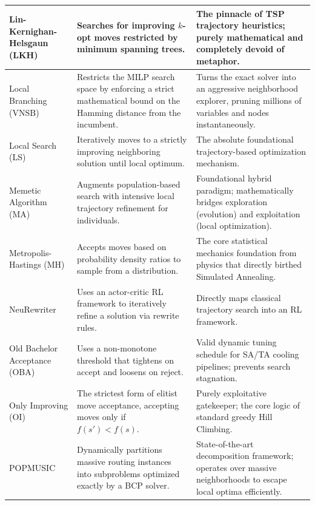 \begin{center}
\begin{longtable}{
  >{\raggedright\arraybackslash}p{}
  >{\raggedright\arraybackslash}p{}
  >{\raggedright\arraybackslash}p{}
}
Lin-Kernighan-Helsgaun (LKH) & Searches for improving $k$-opt moves restricted by minimum spanning trees. & The pinnacle of TSP trajectory heuristics; purely mathematical and completely devoid of metaphor. \\ \midrule

Local Branching (VNSB) & Restricts the MILP search space by enforcing a strict mathematical bound on the Hamming distance from the incumbent. & Turns the exact solver into an aggressive neighborhood explorer, pruning millions of variables and nodes instantaneously. \\ \midrule

Local Search (LS) & Iteratively moves to a strictly improving neighboring solution until local optimum. & The absolute foundational trajectory-based optimization mechanism. \\ \midrule

Memetic Algorithm (MA) & Augments population-based search with intensive local trajectory refinement for individuals. & Foundational hybrid paradigm; mathematically bridges exploration (evolution) and exploitation (local optimization). \\ \midrule

Metropolis-Hastings (MH) & Accepts moves based on probability density ratios to sample from a distribution. & The core statistical mechanics foundation from physics that directly birthed Simulated Annealing. \\ \midrule

NeuRewriter & Uses an actor-critic RL framework to iteratively refine a solution via rewrite rules. & Directly maps classical trajectory search into an RL framework. \\ \midrule

Old Bachelor Acceptance (OBA) & Uses a non-monotone threshold that tightens on accept and loosens on reject. & Valid dynamic tuning schedule for SA/TA cooling pipelines; prevents search stagnation. \\ \midrule

Only Improving (OI) & The strictest form of elitist move acceptance, accepting moves only if $f(s') < f(s)$. & Purely exploitative gatekeeper; the core logic of standard greedy Hill Climbing. \\ \midrule

POPMUSIC & Dynamically partitions massive routing instances into subproblems optimized exactly by a BCP solver. & State-of-the-art decomposition framework; operates over massive neighborhoods to escape local optima efficiently. \\ \midrule


\end{longtable}
\end{center}
